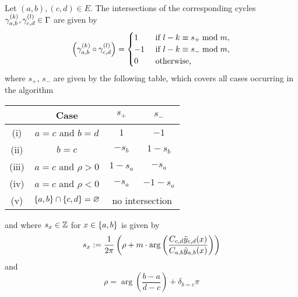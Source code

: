 \documentclass[main.tex]{subfiles}
\begin{document}
   \begin{thm}\label{thm:intsec_numb}
      Let $(a,b),(c,d) \in E$. The intersections of the corresponding cycles $\gamma_{a,b}^{(k)}, \gamma_{c,d}^{(l)} \in \Gamma$ are given by
      \begin{equation*}
          \left(\gamma_{a,b}^{(k)} \circ \gamma_{c,d}^{(l)}\right)
          = \begin{cases}
              1  &\text{ if } l-k \equiv s_+ \bmod m,\\
              -1 &\text{ if } l-k \equiv s_- \bmod m,\\
              0 &\text{ otherwise,}
          \end{cases}
      \end{equation*}
      where $s_+$, $s_-$ are given by the following table, which covers all
      cases occurring in the algorithm
      \begin{center}
      \begin{tabular}{cccc}
          \toprule
          & Case & $s_+$ & $s_-$ \\
          \midrule
         (i) & $a=c$ and $b=d$ & $1$ & $-1$ \\
         (ii) & $b=c$ & $-s_b$ & $1-s_b$ \\
         (iii) & $a=c$ and $\rho>0$ & $1-s_a$ & $-s_a$ \\
         (iv) & $a=c$ and $\rho<0$ & $-s_a$ & $-1-s_a$\\
         (v) & $\left\{a,b\right\}\cap\left\{c,d\right\}=\varnothing$ & \multicolumn{2}{c}{no intersection} \\
          \bottomrule
      \end{tabular}
      \end{center}
      and where $s_x \in \mathbb{Z}$ for $x\in\left\{a,b\right\}$ is given by
      \begin{equation}\label{eq:s_x}
	    s_x := \frac{1}{2\pi}\left( \rho + m \cdot \arg \left( \frac{C_{c,d} \tilde{y}_{c,d}(x)}{C_{a,b}\tilde{y}_{a,b}(x)} \right) 
	    \right)
      \end{equation}
     and
      \begin{equation*}
          \rho = \arg \left( \frac{b-a}{d-c} \right) + \delta_{b=c}\pi
      \end{equation*}
 \end{thm}
 
\end{document}
